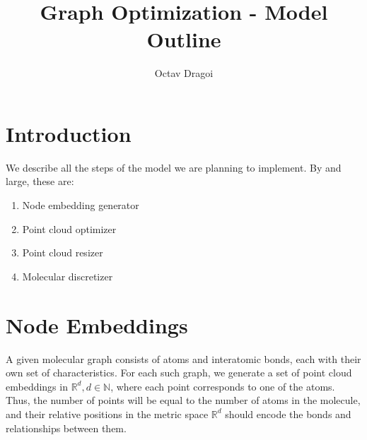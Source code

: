 \documentclass{article}
\begin{document}
\title{Graph Optimization - Model Outline}
\author{Octav Dragoi}

\maketitle

\section{Introduction}
We describe all the steps of the model we are planning to implement. By and large, these are:
\begin{enumerate}
    \item Node embedding generator
    \item Point cloud optimizer
    \item Point cloud resizer
    \item Molecular discretizer
\end{enumerate}

\section{Node Embeddings}
A given molecular graph consists of atoms and interatomic bonds, each with their own set of characteristics. For each such graph, we generate a set of point cloud embeddings in $\mathbb{R}^d, d\in \mathbb{N}$, where each point corresponds to one of the atoms. Thus, the number of points will be equal to the number of atoms in the molecule, and their relative positions in the metric space $\mathbb{R}^d$ should encode the bonds and relationships between them.
\end{document}
